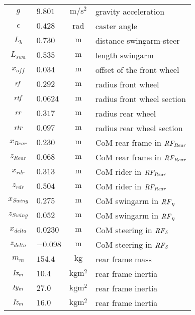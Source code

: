 \begin{longtable}{clcl}
    \hline \hline
    \endlastfoot
$g$         &   $9.801$  &  $\si{\metre/\second^2}$ & gravity acceleration      \\
$\epsilon $ &   $0.428$  &  $\si{\radian}$          & caster angle              \\
$L_b $      &   $0.730$  &  $\si{\metre}$           & distance swingarm-steer   \\
$L_{swa}  $ &   $0.535$  &  $\si{\metre}$           & length swingarm           \\
$x_{off}  $ &   $0.034$  &  $\si{\metre}$           & offset of the front wheel \\
$ \it rf  $ &   $0.292 $ &  $\si{\metre}$           & radius front wheel        \\
$ \it rtf $ &   $0.0624$ &  $\si{\metre}$           & radius front wheel section\\
$ \it rr  $ &   $0.317 $ &  $\si{\metre}$           & radius rear wheel         \\
$ \it rtr $ &   $0.097 $ &  $\si{\metre}$           & radius rear wheel section \\         
$x_{Rear} $ &   $0.230$  &  $\si{\metre}$           & CoM rear frame in $\it RF_{Rear}$  \\  
$z_{Rear }$ &   $0.068 $ &  $\si{\metre}$           & CoM rear frame in $\it RF_{Rear}$  \\
$x_{rdr  }$ &   $0.313 $ &  $\si{\metre}$           & CoM rider in $\it RF_{Rear}$       \\
$z_{rdr  }$ &   $0.504 $ &  $\si{\metre}$           & CoM rider in $\it RF_{Rear}$       \\ 
$x_{Swing}$ &   $0.275 $ &  $\si{\metre}$           & CoM swingarm in ${\it RF}_{\eta}$  \\
$z_{Swing}$ &   $0.052 $ &  $\si{\metre}$           & CoM swingarm in ${\it RF}_{\eta}$  \\
$x_{delta}$ &   $0.0230$ &  $\si{\metre}$           & CoM steering in ${\it RF}_{\delta}$\\
$z_{delta}$ &   $-0.098$ &  $\si{\metre}$           & CoM steering in ${\it RF}_{\delta}$\\
$m_m      $  &  $154.4 $ &   $\si{\kilogram}$               &  rear frame mass     \\
$\it Ix_m $  &  $10.4  $ &   $\si{\kilogram\metre^2}$       &  rear frame inertia  \\
$\it Iy_m $  &  $27.0  $ &   $\si{\kilogram\metre^2}$       &  rear frame inertia  \\
$\it Iz_m $  &  $16.0  $ &   $\si{\kilogram\metre^2}$       &  rear frame inertia  \\

\end{longtable}
